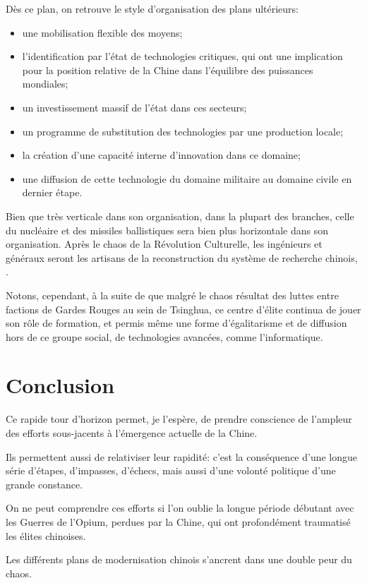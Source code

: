 \documentclass[a4paper]{article}
\begin{document}
Dès ce plan, on retrouve le style d’organisation des plans ultérieurs:
\begin{itemize}
\item une mobilisation flexible des moyens;
\item l’identification par l’état de technologies critiques, qui ont une implication
pour la position relative de la Chine dans l’équilibre des puissances
mondiales;
\item un investissement massif de l’état dans ces secteurs;
\item un programme de substitution des technologies par une production locale;
\item la création d’une capacité interne d’innovation dans ce domaine;
\item une diffusion de cette technologie du domaine militaire au domaine civile en dernier étape.
\end{itemize}

Bien que très verticale dans son organisation, dans la plupart des branches,
celle du nucléaire et des missiles ballistiques sera bien plus horizontale dans
son organisation. Après le chaos de la Révolution Culturelle, les ingénieurs et
généraux seront les artisans de la reconstruction du système de recherche
chinois, \cite{feigenbaum03_chinas}.

Notons, cependant, à la suite de \cite{andreas09_rise} que malgré le chaos
résultat des luttes entre factions de Gardes Rouges au sein de Tsinghua, ce
centre d’élite continua de jouer son rôle de formation, et permis même une forme
d’égalitarisme et de diffusion hors de ce groupe social, de technologies
avancées, comme l’informatique.

\section{Conclusion}
\label{sec:org522d513}
Ce rapide tour d’horizon permet, je l’espère, de prendre conscience de l’ampleur
des efforts sous-jacents à l’émergence actuelle de la Chine.

Ils permettent aussi de relativiser leur rapidité: c’est la conséquence d’une
longue série d’étapes, d’impasses, d’échecs, mais aussi d’une volonté politique
d’une grande constance.

On ne peut comprendre ces efforts si l’on oublie la longue période débutant avec
les Guerres de l’Opium, perdues par la Chine, qui ont profondément traumatisé les
élites chinoises.

Les différents plans de modernisation chinois s’ancrent dans une double peur du
chaos.\\
\end{document}
